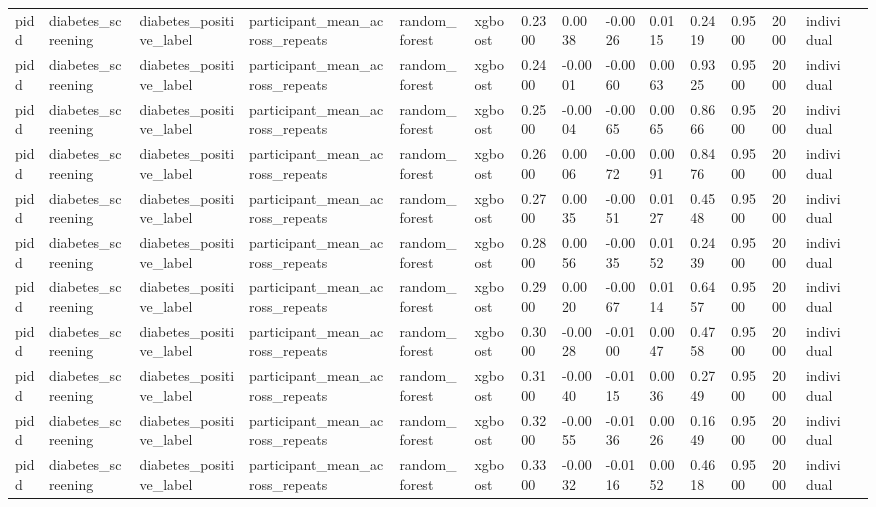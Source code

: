 \begin{tabular}{lllllllllllllll}
pidd & diabetes\_screening & diabetes\_positive\_label & participant\_mean\_across\_repeats & random\_forest & xgboost & 0.2300 & 0.0038 & -0.0026 & 0.0115 & 0.2419 & 0.9500 & 2000 & individual &  \\
pidd & diabetes\_screening & diabetes\_positive\_label & participant\_mean\_across\_repeats & random\_forest & xgboost & 0.2400 & -0.0001 & -0.0060 & 0.0063 & 0.9325 & 0.9500 & 2000 & individual &  \\
pidd & diabetes\_screening & diabetes\_positive\_label & participant\_mean\_across\_repeats & random\_forest & xgboost & 0.2500 & -0.0004 & -0.0065 & 0.0065 & 0.8666 & 0.9500 & 2000 & individual &  \\
pidd & diabetes\_screening & diabetes\_positive\_label & participant\_mean\_across\_repeats & random\_forest & xgboost & 0.2600 & 0.0006 & -0.0072 & 0.0091 & 0.8476 & 0.9500 & 2000 & individual &  \\
pidd & diabetes\_screening & diabetes\_positive\_label & participant\_mean\_across\_repeats & random\_forest & xgboost & 0.2700 & 0.0035 & -0.0051 & 0.0127 & 0.4548 & 0.9500 & 2000 & individual &  \\
pidd & diabetes\_screening & diabetes\_positive\_label & participant\_mean\_across\_repeats & random\_forest & xgboost & 0.2800 & 0.0056 & -0.0035 & 0.0152 & 0.2439 & 0.9500 & 2000 & individual &  \\
pidd & diabetes\_screening & diabetes\_positive\_label & participant\_mean\_across\_repeats & random\_forest & xgboost & 0.2900 & 0.0020 & -0.0067 & 0.0114 & 0.6457 & 0.9500 & 2000 & individual &  \\
pidd & diabetes\_screening & diabetes\_positive\_label & participant\_mean\_across\_repeats & random\_forest & xgboost & 0.3000 & -0.0028 & -0.0100 & 0.0047 & 0.4758 & 0.9500 & 2000 & individual &  \\
pidd & diabetes\_screening & diabetes\_positive\_label & participant\_mean\_across\_repeats & random\_forest & xgboost & 0.3100 & -0.0040 & -0.0115 & 0.0036 & 0.2749 & 0.9500 & 2000 & individual &  \\
pidd & diabetes\_screening & diabetes\_positive\_label & participant\_mean\_across\_repeats & random\_forest & xgboost & 0.3200 & -0.0055 & -0.0136 & 0.0026 & 0.1649 & 0.9500 & 2000 & individual &  \\
pidd & diabetes\_screening & diabetes\_positive\_label & participant\_mean\_across\_repeats & random\_forest & xgboost & 0.3300 & -0.0032 & -0.0116 & 0.0052 & 0.4618 & 0.9500 & 2000 & individual &  \\

\end{tabular}
